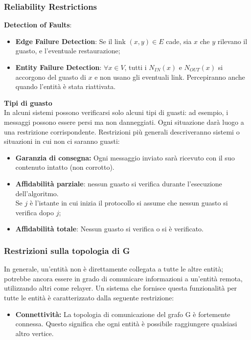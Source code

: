 \subsubsection{Reliability Restrictions}
\textbf{Detection of Faults}:

\begin{itemize}
    \item \textbf{Edge Failure Detection}: Se il link $(x, y) \in E$ cade, sia $x$
          che $y$ rilevano il guasto, e l'eventuale restaurazione;
    \item \textbf{Entity Failure Detection}: $\forall x \in  V$, tutti i
          $N_{IN}(x)$ e $N_{OUT}(x)$ si accorgono del guasto di $x$ e non usano gli
          eventuali link. Percepiranno anche quando l'entità è stata riattivata.
\end{itemize}

\textbf{Tipi di guasto}\\
In alcuni sistemi possono verificarsi solo alcuni tipi di guasti: ad esempio, i
messaggi possono essere persi ma non danneggiati. Ogni situazione darà luogo a
una restrizione corrispondente. Restrizioni più generali descriveranno sistemi o
situazioni in cui non ci saranno guasti:

\begin{itemize}
    \item \textbf{Garanzia di consegna:} Ogni messaggio inviato sarà ricevuto con
          il suo contenuto intatto (non corrotto).
    \item \textbf{Affidabilità parziale}: nessun guasto si verifica durante
          l'esecuzione dell'algoritmo.\\
          Se $j$ è l'istante in cui inizia il protocollo si assume che nessun
          guasto si verifica dopo $j$;
    \item \textbf{Affidabilità totale}: Nessun guasto si verifica o si è
          verificato.
\end{itemize}

\subsubsection{Restrizioni sulla topologia di G}
In generale, un'entità non è direttamente collegata a tutte le altre entità;
potrebbe ancora essere in grado di comunicare informazioni a un'entità remota,
utilizzando altri come relayer. Un sistema che fornisce questa funzionalità per
tutte le entità è caratterizzato dalla seguente restrizione:

\begin{itemize}
    \item \textbf{ Connettività:} La topologia di comunicazione del grafo G è
          fortemente connessa. Questo significa che ogni entità è possibile raggiungere
          qualsiasi altro vertice.
\end{itemize}

